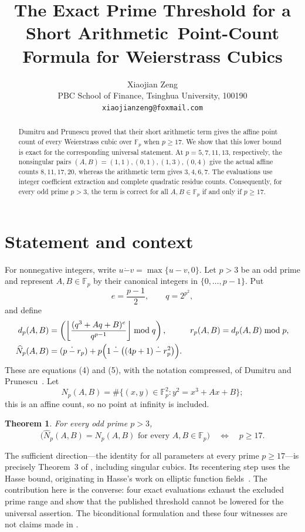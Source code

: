 \documentclass[11pt]{article}
\title{The Exact Prime Threshold for a Short Arithmetic\
Point-Count Formula for Weierstrass Cubics}
\author{Xiaojian Zeng\\
PBC School of Finance, Tsinghua University, 100190\\
\texttt{xiaojianzeng@foxmail.com}}
\date{}
\newtheorem{theorem}{Theorem}
\newcommand{\F}{\mathbb F}
\newcommand{\dminus}{\mathbin{\dot{-}}}
\begin{document}
\maketitle

\begin{abstract}
Dumitru and Prunescu proved that their short arithmetic term gives the
affine point count of every Weierstrass cubic over \(\F_p\) when \(p\geq17\).
We show that this lower bound is exact for the corresponding universal
statement.  At \(p=5,7,11,13\), respectively, the nonsingular pairs
\((A,B)=(1,1),(0,1),(1,3),(0,4)\) give the actual affine counts
\(8,11,17,20\), whereas the arithmetic term gives \(3,4,6,7\).
The evaluations use integer coefficient extraction and complete quadratic
residue counts.  Consequently, for every odd prime \(p>3\), the term is
correct for all \(A,B\in\F_p\) if and only if \(p\geq17\).
\end{abstract}

\section{Statement and context}

For nonnegative integers, write \(u\dminus v=\max\{u-v,0\}\).  Let \(p>3\)
be an odd prime and represent \(A,B\in\F_p\) by their canonical integers in
\(\{0,\ldots,p-1\}\).  Put
\[
 e=\frac{p-1}{2},\qquad q=2^{p^2},
\]
and define
\begin{align}
 d_p(A,B)
   &=\left(\left\lfloor
       \frac{(q^3+Aq+B)^e}{q^{p-1}}
      \right\rfloor\bmod q\right),
 &r_p(A,B)&=d_p(A,B)\bmod p,                                      \label{eq:r}\\
 \widehat N_p(A,B)
   &=(p\dminus r_p)+p\Bigl(1\dminus
      \bigl((4p+1)\dminus r_p^2\bigr)\Bigr).                     \label{eq:nhat}
\end{align}
These are equations (4) and (5), with the notation compressed, of Dumitru
and Prunescu~\cite{DumitruPrunescu2026}.  Let
\[
 N_p(A,B)=\#\{(x,y)\in\F_p^2:y^2=x^3+Ax+B\};
\]
this is an affine count, so no point at infinity is included.

\begin{theorem}\label{thm:main}
For every odd prime \(p>3\),
\[
 \bigl(\widehat N_p(A,B)=N_p(A,B)\text{ for every }A,B\in\F_p\bigr)
 \quad\Longleftrightarrow\quad p\geq17.
\]
\end{theorem}

The sufficient direction---the identity for all parameters at every prime
\(p\geq17\)---is precisely Theorem~3 of
\cite{DumitruPrunescu2026}, including singular cubics.  Its recentering step
uses the Hasse bound, originating in Hasse's work on elliptic function
fields~\cite{Hasse1936}.  The contribution here is the converse: four exact
evaluations exhaust the excluded prime range and show that the published
threshold cannot be lowered for the universal assertion.  The biconditional
formulation and these four witnesses are not claims made in
\cite{DumitruPrunescu2026}.
\end{document}
